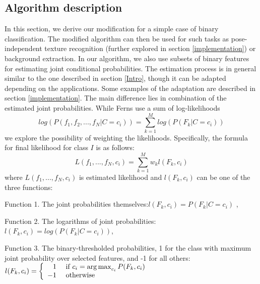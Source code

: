 \subsection{Algorithm description}
\label{malg}
In this section, we derive our modification for a simple case of binary classification. The modified algorithm can then be used for such tasks as pose-independent texture recognition (further explored in section \ref{implementation}) or background extraction.
In our algorithm, we also use subsets of binary features for estimating joint conditional probabilities. The estimation process is in general similar to the one described in section \ref{Intro}, though it can be adapted depending on the applications. Some examples of the adaptation are described in section \ref{implementation}.  The main difference lies in combination of the estimated joint probabilities. While Ferns use a sum of log-likelihoods
\begin{equation}
\label{logsum}
log(P(f_1,f_2,...,f_N|C=c_i))=\sum_{k=1}^{M}log(P(F_k|C=c_i))
\end{equation}
we explore the possibility of weighting the likelihoods. Specifically, the formula for final likelihood for class $I$ is as follows:\begin{equation}
\label{norsum}
L(f_1,...,f_N,c_i)=\sum_{k=1}^{M}w_k l(F_k,c_i)
\end{equation}
where $L(f_1,...,f_N,c_i)$ is estimated likelihood and $l(F_k,c_i)$ can be one of the three functions: 

Function 1. The joint probabilities themselves:$l(F_k,c_i)=P(F_k|C=c_i)$ ,

Function 2. The logarithms of joint probabilities: $l(F_k,c_i)=log(P(F_k|C=c_i))$,

Function 3. The binary-thresholded probabilities, 1 for the class with maximum joint probability over selected features, and -1 for all others: $l(F_k,c_i)= \left\{ \begin{array}{rl}
1 &\mbox{ if } c_i=\operatorname*{arg\,max}_{c_i}{P(F_k,c_i)} \\
-1 &\mbox{ otherwise}
\end{array} \right.$


